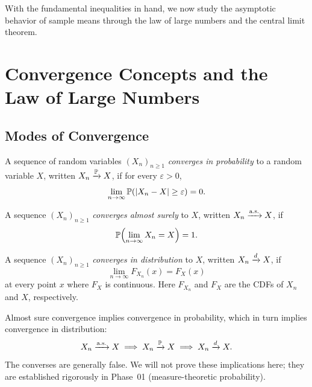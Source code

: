 \documentclass[11pt,a4paper]{article}
\begin{document}
With the fundamental inequalities in hand, we now study the asymptotic
behavior of sample means through the law of large numbers and the
central limit theorem.


\section{Convergence Concepts and the Law of Large Numbers}
\label{sec:lln}

\subsection{Modes of Convergence}

\begin{definition}
\label{def:conv_prob}
A sequence of random variables $(X_n)_{n \geq 1}$ \emph{converges in
probability} to a random variable $X$, written $X_n \xrightarrow{\mathbb{P}} X$, if
for every $\varepsilon > 0$,
\[
    \lim_{n \to \infty} \mathbb{P}(|X_n - X| \geq \varepsilon) = 0.
\]
\end{definition}

\begin{definition}
\label{def:conv_as}
A sequence $(X_n)_{n \geq 1}$ \emph{converges almost surely} to $X$,
written $X_n \xrightarrow{\text{a.s.}} X$, if
\[
    \mathbb{P}\!\left(\lim_{n \to \infty} X_n = X\right) = 1.
\]
\end{definition}

\begin{definition}
\label{def:conv_dist}
A sequence $(X_n)_{n \geq 1}$ \emph{converges in distribution} to $X$,
written $X_n \xrightarrow{d} X$, if
\[
    \lim_{n \to \infty} F_{X_n}(x) = F_X(x)
\]
at every point $x$ where $F_X$ is continuous. Here $F_{X_n}$ and
$F_X$ are the CDFs of $X_n$ and $X$, respectively.
\end{definition}

\begin{remark}
\label{rem:convergence_hierarchy}
Almost sure convergence implies convergence in probability, which in
turn implies convergence in distribution:
\[
    X_n \xrightarrow{\text{a.s.}} X \;\Longrightarrow\; X_n \xrightarrow{\mathbb{P}} X
    \;\Longrightarrow\; X_n \xrightarrow{d} X.
\]
The converses are generally false. We will not prove these
implications here; they are established rigorously in Phase~01
(measure-theoretic probability).
\end{remark}
\end{document}
